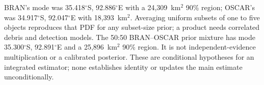 BRAN's mode was 35.418$^{\circ}$S, 92.886$^{\circ}$E with a 24,309~km$^2$ 90\%
region; OSCAR's was 34.917$^{\circ}$S, 92.047$^{\circ}$E with 18,393~km$^2$.
Averaging uniform subsets of one to five objects reproduces that PDF for any
subset-size prior; a product needs correlated debris and detection models. The
50:50 BRAN--OSCAR prior mixture has mode 35.300$^{\circ}$S,
92.891$^{\circ}$E and a 25,896~km$^2$ 90\% region. It is not
independent-evidence multiplication or a calibrated posterior. These are
conditional hypotheses for an integrated estimator; none establishes identity
or updates the main estimate unconditionally.

